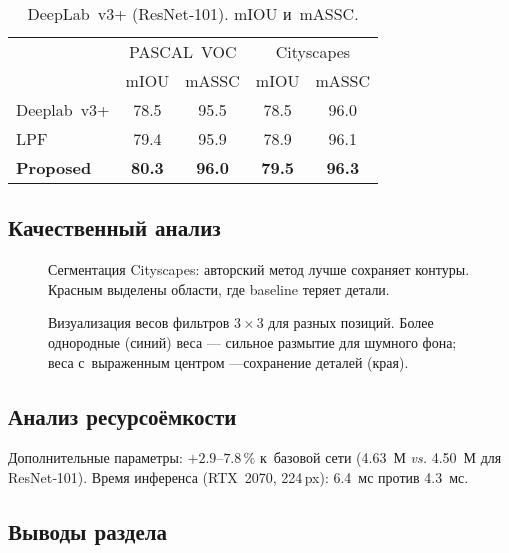 \begin{table}[t]
  \centering
  \caption{DeepLab v3+ (ResNet‑101). mIOU и mASSC.}
  \label{tab:seg}
  \begin{tabular}{@{}lcccc@{}}
    \toprule
     & \multicolumn{2}{c}{PASCAL VOC} & \multicolumn{2}{c}{Cityscapes}\\
    \cmidrule(lr){2-3} \cmidrule(l){4-5}
     & mIOU & mASSC & mIOU & mASSC\\
    \midrule
    Deeplab v3+ & 78.5 & 95.5 & 78.5 & 96.0\\
    LPF & 79.4 & 95.9 & 78.9 & 96.1\\
    \textbf{Proposed} & \textbf{80.3} & \textbf{96.0} & \textbf{79.5} & \textbf{96.3}\\
    \bottomrule
  \end{tabular}
\end{table}

\subsection{Качественный анализ}

\begin{figure}[t]
  \centering
  \caption{Сегментация Cityscapes: авторский метод лучше сохраняет контуры.
  Красным выделены области, где baseline теряет детали.}
  \label{fig:cityscapes_qual}
\end{figure}

\begin{figure}[t]
  \centering
  \caption{Визуализация весов фильтров $3\times3$ для разных позиций. Более однородные
  (синий) веса — сильное размытие для шумного фона; веса с выраженным центром —\n  сохранение деталей (края).}
  \label{fig:filter_vis}
\end{figure}

\subsection{Анализ ресурсоёмкости}

Дополнительные параметры: $+2.9$–$7.8\,\%$ к базовой сети (4.63 М \emph{vs.}
4.50 М для ResNet‑101). Время инференса (RTX 2070, 224\,px): 6.4 мс против 4.3 мс.

\subsection{Выводы раздела}

